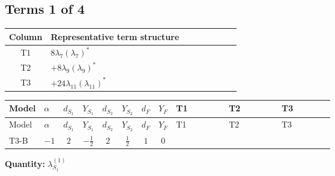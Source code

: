 \documentclass[8pt]{article}
\begin{document}
\begin{landscape}
\subsection*{Terms 1 of 4}
\begin{center}
\begin{tabular}{@{}c >{\raggedright\arraybackslash}p{0.82\linewidth}@{}}
\toprule
Column & Representative term structure \\
\midrule
T1 & \(\displaystyle 8 {\lambda_7} \left({\lambda_7}\right)^{*}\) \\
\midrule
T2 & \(\displaystyle +8 {\lambda_9} \left({\lambda_9}\right)^{*}\) \\
\midrule
T3 & \(\displaystyle +24 {\lambda_{11}} \left({\lambda_{11}}\right)^{*}\) \\
\midrule
\bottomrule
\end{tabular}
\end{center}
\smallskip
\tiny
\begin{longtable}{@{}llcccccc >{\raggedright\arraybackslash}p{0.21\linewidth} >{\raggedright\arraybackslash}p{0.21\linewidth} >{\raggedright\arraybackslash}p{0.21\linewidth}@{}}
\toprule
Model & $\alpha$ & $d_{S_1}$ & $Y_{S_1}$ & $d_{S_2}$ & $Y_{S_2}$ & $d_F$ & $Y_F$ & T1 & T2 & T3 \\
\midrule
\endfirsthead
\toprule
Model & $\alpha$ & $d_{S_1}$ & $Y_{S_1}$ & $d_{S_2}$ & $Y_{S_2}$ & $d_F$ & $Y_F$ & T1 & T2 & T3 \\
\midrule
\endhead
T3-B & $-1$ & $2$ & $-\frac{1}{2}$ & $2$ & $\frac{1}{2}$ & $1$ & $0$ & \scriptsize\adjustbox{max width=\linewidth}{$\begin{gathered} 8 {\lambda_7} \left({\lambda_7}\right)^{*}\end{gathered}$} & \scriptsize\adjustbox{max width=\linewidth}{$\begin{gathered} +8 {\lambda_9} \left({\lambda_9}\right)^{*}\end{gathered}$} & \scriptsize\adjustbox{max width=\linewidth}{$\begin{gathered} +24 {\lambda_{11}} \left({\lambda_{11}}\right)^{*}\end{gathered}$} \\
\midrule
\bottomrule
\end{longtable}
\clearpage
\noindent\textbf{Quantity: }$\lambda_{S_1}^{(1)}$\par\smallskip

\end{landscape}
\end{document}
